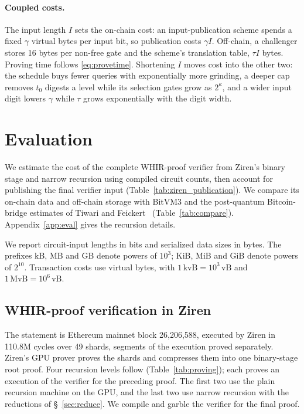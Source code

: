\documentclass[11pt]{article}
\begin{document}
\paragraph{Coupled costs.} The input length $I$ sets the on-chain cost: an
input-publication scheme spends a fixed $\gamma$ virtual bytes per input bit,
so publication costs $\gamma I$. Off-chain, a challenger stores
16 bytes per non-free gate and the scheme's translation table, $\tau I$
bytes. Proving time follows \eqref{eq:provetime}. Shortening $I$ moves cost
into the other two: the schedule buys fewer queries with exponentially more
grinding, a deeper cap removes $t_0$ digests a level while its selection gates
grow as $2^\kappa$, and a wider input digit lowers $\gamma$ while $\tau$ grows exponentially
with the digit width.

\section{Evaluation}\label{sec:eval}

We estimate the cost of the complete WHIR-proof verifier from Ziren's binary
stage and narrow recursion using compiled circuit counts, then account for
publishing the final verifier input (Table~\ref{tab:ziren_publication}). We
compare its on-chain data and off-chain storage with BitVM3 and the
post-quantum Bitcoin-bridge estimates of Tiwari and Feickert~\cite{tf26pq}
(Table~\ref{tab:compare}). Appendix~\ref{app:eval} gives the recursion
details.

We report circuit-input lengths in bits and serialized data sizes in bytes.
The prefixes kB, MB and GB denote powers of $10^3$; KiB, MiB and GiB denote
powers of $2^{10}$. Transaction costs use virtual bytes, with
$1\,\mathrm{kvB}=10^3\,\mathrm{vB}$ and
$1\,\mathrm{MvB}=10^6\,\mathrm{vB}$.

\subsection{WHIR-proof verification in Ziren}\label{sec:cost_eval}

The statement is Ethereum mainnet block 26{,}206{,}588, executed by Ziren in
110.8M cycles over 49 shards, segments of the execution proved separately. Ziren's GPU prover proves the shards and
compresses them into one binary-stage root proof. Four recursion levels
follow (Table~\ref{tab:proving}); each proves an execution of the verifier for
the preceding proof. The first two use the plain recursion machine on the
GPU, and the last two use narrow recursion with the reductions of
\S~\ref{sec:reduce}. We compile and garble the verifier for the final proof.
\end{document}
